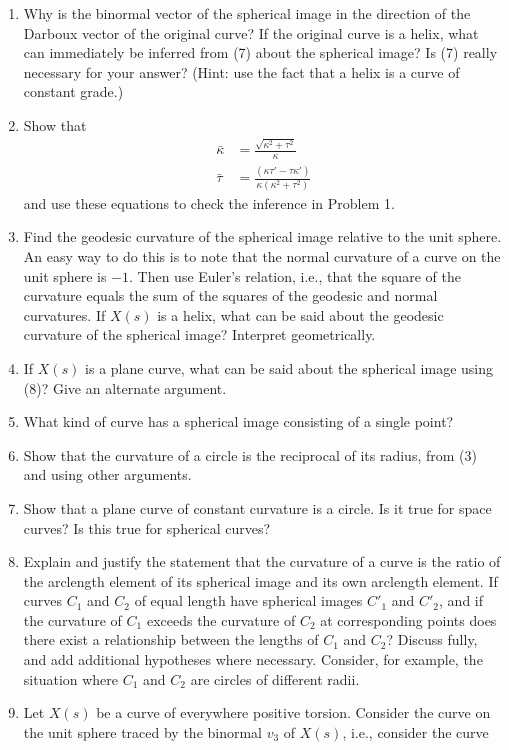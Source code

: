 \documentclass{book}
\begin{document}
\begin{enumerate}
  \item Why is the binormal vector of the spherical image in the direction of the Darboux vector of the original curve? If the original curve is a helix, what can immediately be inferred from (7) about the spherical image? Is (7) really necessary for your answer? (Hint: use the fact that a helix is a curve of constant grade.)
  \item Show that
    \begin{align}
      \bar{\kappa} & = \frac{ \sqrt{\kappa ^{2} + \tau ^{2}} }{\kappa} \\
      \bar{\tau} & = \frac{ (\kappa \tau ' - \tau \kappa ') }{ \kappa (\kappa ^{2} + \tau ^{2}) }
    \end{align}
    and use these equations to check the inference in Problem 1.
  \item Find the geodesic curvature of the spherical image relative to the unit sphere. An easy way to do this is to note that the normal curvature of a curve on the unit sphere is $-1$. Then use Euler's relation, i.e., that the square of the curvature equals the sum of the squares of the geodesic and normal curvatures. If $X(s)$ is a helix, what can be said about the geodesic curvature of the spherical image? Interpret geometrically.
  \item If $X(s)$ is a plane curve, what can be said about the spherical image using (8)? Give an alternate argument.
  \item What kind of curve has a spherical image consisting of a single point?
  \item Show that the curvature of a circle is the reciprocal of its radius, from (3) and using other arguments.
  \item Show that a plane curve of constant curvature is a circle. Is it true for space curves? Is this true for spherical curves?
  \item Explain and justify the statement that the curvature of a curve is the ratio of the arclength element of its spherical image and its own arclength element. If curves $C_{1}$ and $C_{2}$ of equal length have spherical images $C'_{1}$ and $C'_{2}$, and if the curvature of $C_{1}$ exceeds the curvature of $C_{2}$ at corresponding points does there exist a relationship between the lengths of $C_{1}$ and $C_{2}$? Discuss fully, and add additional hypotheses where necessary. Consider, for example, the situation where $C_{1}$ and $C_{2}$ are circles of different radii.
  \item Let $X(s)$ be a curve of everywhere positive torsion. Consider the curve on the unit sphere traced by the binormal $v_{3}$ of $X(s)$, i.e., consider the curve

\end{enumerate}
\end{document}
